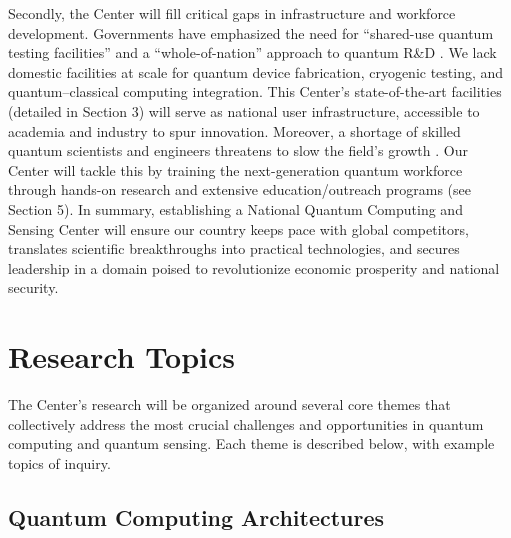 \documentclass[12pt]{article}
\begin{document}
Secondly, the Center will fill critical gaps in infrastructure and workforce development. Governments have emphasized the need for “shared-use quantum testing facilities” and a “whole-of-nation” approach to quantum R&D . We lack domestic facilities at scale for quantum device fabrication, cryogenic testing, and quantum–classical computing integration. This Center’s state-of-the-art facilities (detailed in Section 3) will serve as national user infrastructure, accessible to academia and industry to spur innovation. Moreover, a shortage of skilled quantum scientists and engineers threatens to slow the field’s growth . Our Center will tackle this by training the next-generation quantum workforce through hands-on research and extensive education/outreach programs (see Section 5). In summary, establishing a National Quantum Computing and Sensing Center will ensure our country keeps pace with global competitors, translates scientific breakthroughs into practical technologies, and secures leadership in a domain poised to revolutionize economic prosperity and national security.



\section{Research Topics}



The Center’s research will be organized around several core themes that collectively address the most crucial challenges and opportunities in quantum computing and quantum sensing. Each theme is described below, with example topics of inquiry.



\subsection{Quantum Computing Architectures}
\end{document}
